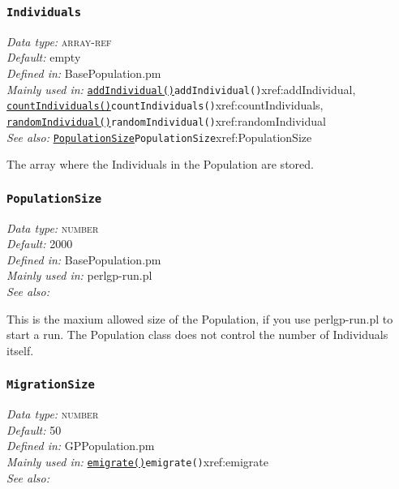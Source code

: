 \documentclass[a4paper]{article}
\begin{document}
\subsubsection{\texttt{Individuals}}\label{xref:Individuals}
\begin{flushleft}
\textit{Data type:} \textsc{array-ref}\\
\textit{Default:} empty\\
\textit{Defined in:} BasePopulation.pm\\
\textit{Mainly used in:} \hyperref[no]{\texttt{addIndividual()}}{\texttt{addIndividual()}}{xref:addIndividual}, \hyperref[no]{\texttt{countIndividuals()}}{\texttt{countIndividuals()}}{xref:countIndividuals}, \hyperref[no]{\texttt{randomIndividual()}}{\texttt{randomIndividual()}}{xref:randomIndividual}\\
\textit{See also:} \hyperref[no]{\texttt{PopulationSize}}{\texttt{PopulationSize}}{xref:PopulationSize}
\end{flushleft}

The array where the Individuals in the Population are stored.

\subsubsection{\texttt{PopulationSize}}\label{xref:PopulationSize}
\begin{flushleft}
\textit{Data type:} \textsc{number}\\
\textit{Default:} 2000\\
\textit{Defined in:} BasePopulation.pm\\
\textit{Mainly used in:} perlgp-run.pl\\
\textit{See also:}
\end{flushleft}

This is the maxium allowed size of the Population, if you use
perlgp-run.pl to start a run.  The Population class does not control
the number of Individuals itself.


\subsubsection{\texttt{MigrationSize}}\label{xref:MigrationSize}
\begin{flushleft}
\textit{Data type:} \textsc{number}\\
\textit{Default:} 50\\
\textit{Defined in:} GPPopulation.pm\\
\textit{Mainly used in:} \hyperref[no]{\texttt{emigrate()}}{\texttt{emigrate()}}{xref:emigrate}\\
\textit{See also:}
\end{flushleft}
\end{document}
